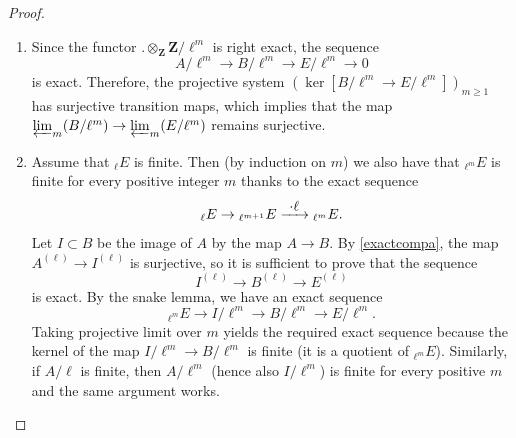 \documentclass[10pt,a4paper]{amsart}
\newenvironment{enumeratea}
{\bgroup\def\theenumi{\alph{enumi}}\begin{enumerate}}
{\end{enumerate}\egroup}
\newcommand\To[1]{\mathchoice{\xrightarrow{\textstyle\kern4pt#1\kern3pt}}{\stackrel{#1}{\longrightarrow}}{}{}}
\theoremstyle{plain}
\theoremstyle{definition}
\newcommand \ZZ {\mathbf{Z}}
\begin{document}
\begin{proof}
\begin{enumeratea}
\item
Since the functor $. \otimes_{\ZZ} \ZZ/\ell^m$ is right exact,
the sequence
\[
A/\ell^m \to B/\ell^m \to E/\ell^m \to 0
\]
is exact. Therefore, the projective system
$(\ker [B/\ell^m \to E/\ell^m])_{m \geq 1}$
has surjective transition maps, which
implies that the map $\varprojlim_m (B/\ell^m) \to \varprojlim_m (E/\ell^m)$
remains surjective.

\item
Assume that $_{\ell} E $ is finite. Then
(by induction on $m$) we also have that $_{\ell^m} E$ is finite
for every positive integer $m$ thanks to the exact sequence
\[
_{\ell} E \to{}_{\ell^{m+1}} E \To{\cdot\ell}{}_{\ell^m} E.
\]
Let $I \subset B$ be the image of $A$ by the map $A \to B$.
By \eqref{exactcompa}, the map $A^{(\ell)} \to I^{(\ell)}$ is surjective, so
it is sufficient to prove that the sequence
\[
I^{(\ell)} \to B^{(\ell)} \to E^{(\ell)}
\]
is exact. By the snake lemma, we have an exact sequence
\[
_{\ell^m} E \to I/\ell^m \to B/\ell^m \to E/\ell^m.
\]
Taking projective limit over $m$ yields the required exact sequence
because the kernel of the map $I/\ell^m \to B/\ell^m$ is finite
(it is a quotient of $_{\ell^m} E$). Similarly, if $A/\ell$ is finite,
then $A/\ell^m$ (hence also $I/\ell^m$) is finite for every positive
$m$ and the same argument works.\qedhere
\end{enumeratea}
\end{proof}
\end{document}
